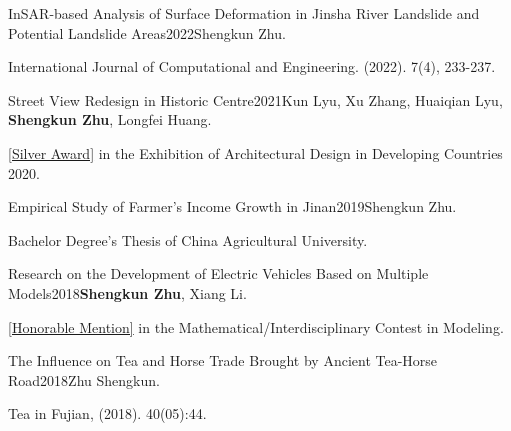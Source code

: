 \documentclass{joel_cv}
\begin{document}
\begin{enumerate}[label={[\arabic*]}]
	\item \begin{sectionContentNormal}{InSAR-based Analysis of Surface Deformation in Jinsha River Landslide and Potential Landslide Areas}{2022}{Shengkun Zhu.}
	\item International Journal of Computational and Engineering. (2022). 7(4), 233-237.
\end{sectionContentNormal}	
	
	\item \begin{sectionContentNormal}{Street View Redesign in Historic Centre}{2021}{Kun Lyu, Xu Zhang, Huaiqian Lyu, \textbf{Shengkun Zhu}, Longfei Huang.} 
		
		\item \href{https://zhu-sk.github.io/SilverAward.pdf}{[Silver Award]} in the Exhibition of Architectural Design in Developing Countries 2020.
	\end{sectionContentNormal}
	
			\item \begin{sectionContentNormal}{Empirical Study of Farmer's Income Growth in Jinan}{2019}{Shengkun Zhu.}
		\item Bachelor Degree's Thesis of China Agricultural University.
	\end{sectionContentNormal}
	
		\item \begin{sectionContentNormal}{Research on the Development of Electric Vehicles Based on Multiple Models}{2018}{\textbf{Shengkun Zhu}, Xiang Li.}
		\item \href{https://zhu-sk.github.io/MCM_ICM.pdf}{[Honorable Mention]} in the Mathematical/Interdisciplinary Contest in Modeling.
	\end{sectionContentNormal}
	
	\item \begin{sectionContentNormal}{The Influence on Tea and Horse Trade Brought by Ancient Tea-Horse Road}{2018}{Zhu Shengkun.}
		\item Tea in Fujian, (2018). 40(05):44. \quad[\href{https://kns.cnki.net/kcms/detail/detail.aspx?filename=FJCA201805033&dbcode=CJFD&dbname=CJFD2018&v=MXO0__U8baKAFg0Sfliov8dzDLD2IlJKRJF6rLWVZCfeCs9Ao2V0lmKuTQcpUF2x}{Paper}]
	\end{sectionContentNormal}
	

\end{enumerate}
\end{document}
